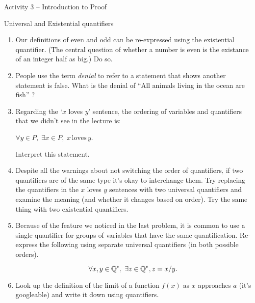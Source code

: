 \documentclass{amsart}
\begin{document}
\thispagestyle{empty}

\centerline{\Large Activity 3 -- Introduction to Proof}
\centerline{\large Universal and Existential quantifiers}

\bigskip
\Large


\begin{enumerate}
\item Our definitions of even and odd can be re-expressed using the existential quantifier.  (The central question of whether a number is even is the existance of an integer half as big.) Do so.

\vfill

\item People use the term {\em denial} to refer to a statement that shows another statement is false.  What is the denial of ``All animals living in the ocean are fish''  ?

\vfill

\item Regarding the `$x$ loves $y$' sentence, the ordering of variables and quantifiers that we didn't see in the lecture is:
 
\rule{0pt}{24pt} $\displaystyle \forall y \in P, \; \exists x \in P, \; x \, \mbox{loves} \, y$.

Interpret this statement.

\vfill

\newpage

\item Despite all the warnings about not switching the order of quantifiers, if two quantifiers are of the same type it's okay to interchange them.  Try replacing the quantifiers in the $x$ loves $y$ sentences with two universal quantifiers and examine the meaning (and whether it changes based on order).  Try the same thing with two existential quantifiers.

\vfill

\item Because of the feature we noticed in the last problem, it is common to use a single quantifier for groups of variables that have the same quantification.  Re-express the following using separate universal quantifiers (in both possible orders).

\[ \forall x, y \in {\mathbb Q}^\ast, \; \exists z \in {\mathbb Q}^\ast, z =x/y. \]

\vfill

\item Look up the definition of the limit of a function $f(x)$ as $x$ approaches $a$ (it's googleable) and write it down using quantifiers.

\vfill

\end{enumerate}
\end{document}
